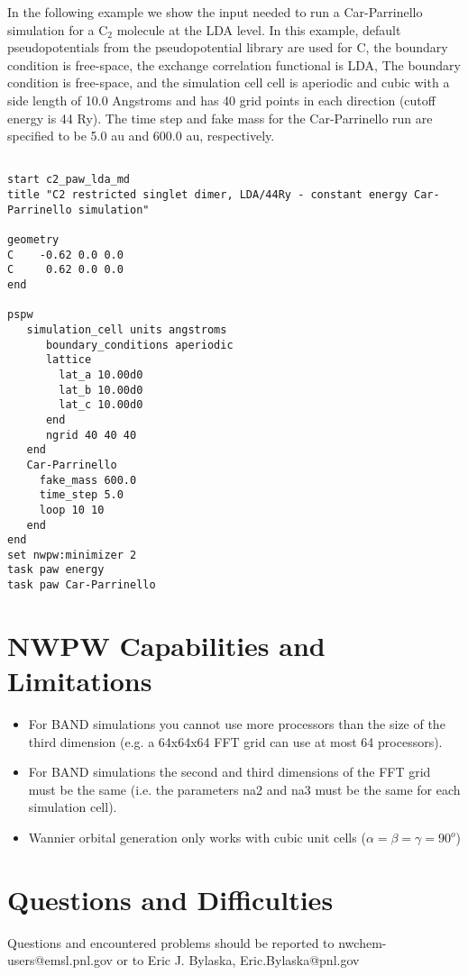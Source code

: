 In the following example we show the input needed to run a Car-Parrinello simulation
for a C$_2$ molecule at the LDA level.  In this example, default pseudopotentials
from the pseudopotential library are used for C, the boundary condition is free-space, 
the exchange correlation functional is LDA, The boundary condition is free-space, and 
the simulation cell cell is aperiodic and cubic with a side length of 10.0 Angstroms and has
40 grid points in each direction (cutoff energy is 44 Ry).  The time step and fake mass
for the Car-Parrinello run are specified to be 5.0 au and 600.0 au, respectively.  

\begin{verbatim}
         
start c2_paw_lda_md
title "C2 restricted singlet dimer, LDA/44Ry - constant energy Car-Parrinello simulation"

geometry  
C    -0.62 0.0 0.0
C     0.62 0.0 0.0
end
       
pspw
   simulation_cell units angstroms
      boundary_conditions aperiodic
      lattice
        lat_a 10.00d0
        lat_b 10.00d0
        lat_c 10.00d0
      end
      ngrid 40 40 40
   end
   Car-Parrinello
     fake_mass 600.0
     time_step 5.0
     loop 10 10
   end
end
set nwpw:minimizer 2
task paw energy
task paw Car-Parrinello
\end{verbatim}



\section{NWPW Capabilities and Limitations}
\label{sec:pspw_limits}
\normalsize

\begin{itemize}
\item For BAND simulations you cannot use more processors than the size of the third dimension 
  (e.g. a 64x64x64 FFT grid can use at most 64 processors).
\item For BAND simulations the second and third dimensions of the FFT grid must be the same 
  (i.e. the parameters na2 and na3 must be the same for each simulation cell).
\item Wannier orbital generation only works with cubic unit cells ($\alpha=\beta=\gamma=90^o$)
\end{itemize}


\section{Questions and Difficulties}
\normalsize

Questions and encountered problems should be reported to 
nwchem-users@emsl.pnl.gov 
or to Eric J. Bylaska, Eric.Bylaska@pnl.gov





